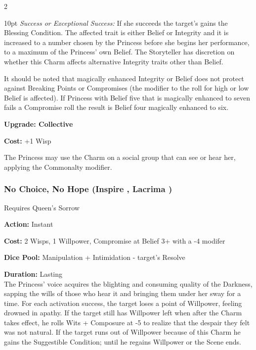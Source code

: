 \begin{multicols}{2}
\begin{myindentpar}{10pt}
    \emph{Success or Exceptional Success:} If she succeeds the target's gains the Blessing Condition. The affected trait is either Belief or Integrity and it is increased to a number chosen by the Princess before she begins her performance, to a maximum of the Princess' own Belief. The Storyteller has discretion on whether this Charm affects alternative Integrity traits other than Belief.  

     It should be noted that magically enhanced Integrity or Belief does not protect against Breaking Points or Compromises (the modifier to the roll for high or low Belief is affected). If Princess with Belief five that is magically enhanced to seven fails a Compromise roll the result is Belief four magically enhanced to six. 

\textbf{Upgrade: Collective}

\noindent \textbf{Cost:} +1 Wisp

The Princess may use the Charm on a social group that can see or hear her, applying the Commonalty modifier.\end{myindentpar}

\subsubsection*{No Choice, No Hope (Inspire \textbullet\textbullet\textbullet\textbullet, Lacrima \textbullet\textbullet\textbullet)}

\noindent Requires Queen's Sorrow

\noindent \textbf{Action:} Instant

\noindent \textbf{Cost:} 2 Wisps, 1 Willpower, Compromise at Belief 3+ with a -4 modifer

\noindent \textbf{Dice Pool:}  Manipulation + Intimidation - target's Resolve

\noindent \textbf{Duration:} Lasting \\

\noindent The Princess' voice acquires the blighting and consuming quality of the Darkness, sapping the wills of those who hear it and bringing them under her sway for a time. For each activation success, the target loses a point of Willpower, feeling drowned in apathy. If the target still has Willpower left when after the Charm takes effect, he rolls Wits + Composure at -5 to realize that the despair they felt was not natural. If the target runs out of Willpower because of this Charm he gains the Suggestible Condition; until he regains Willpower or the Scene ends.


\end{multicols}
